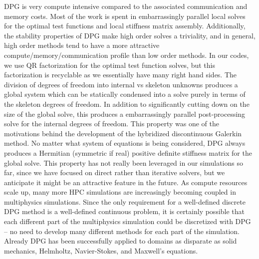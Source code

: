 \documentclass[preprint,12pt]{elsarticle}
\begin{document}
DPG is very compute intensive compared to the associated communication and memory costs.
Most of the work is spent in embarrassingly parallel local solves for the optimal test functions and local stiffness matrix assembly.
Additionally, the stability properties of DPG make high order solves a triviality, and in general, 
high order methods tend to have a more attractive compute/memory/communication profile than low order methods.
In our codes, we use QR factorization for the optimal test function solves, but this factorization is recyclable as we essentially have many right hand sides.
The division of degrees of freedom into internal vs skeleton unknowns produces a global system which can be statically condensed into 
a solve purely in terms of the skeleton degrees of freedom.
In addition to significantly cutting down on the size of the global solve, 
this produces a embarrassingly parallel post-processing solve for the internal degrees of freedom.
This property was one of the motivations behind the development of the hybridized discontinuous Galerkin\cite{HDG} method.
No matter what system of equations is being considered, DPG always produces a Hermitian (symmetric if real) 
positive definite stiffness matrix for the global solve.
This property has not really been leveraged in our simulations so far, since we have focused on direct rather than iterative solvers, but we
anticipate it might be an attractive feature in the future.
As compute resources scale up, many more HPC simulations are increasingly becoming coupled in multiphysics simulations.
Since the only requirement for a well-defined discrete DPG method is a well-defined continuous problem, it is certainly possible that each different part of the multiphysics simulation could be discretized with DPG -- no need to develop many different methods for each part of the simulation.
Already DPG has been successfully applied to domains as disparate as solid mechanics\cite{BramwellDPG}, Helmholtz\cite{DPGHelmholtz}, 
Navier-Stokes\cite{NateDissertation,JesseDissertation}, and Maxwell's equations\cite{PracticalDPG}.

\end{document}
